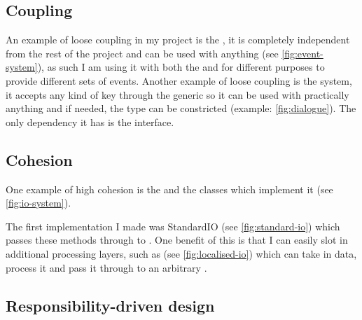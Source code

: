 \documentclass{article}
\begin{document}
\begin{multicols}{2}
            \subsection{Coupling}
                An example of loose coupling in my project is the , it is completely independent from the rest of the project and can be used with anything (see \autoref{fig:event-system}), as such I am using it with both the  and  for different purposes to provide different sets of events. Another example of loose coupling is the  system, it accepts any kind of key through the generic  so it can be used with practically anything and if needed, the type can be constricted (example: \autoref{fig:dialogue}). The only dependency it has is the  interface.

            \subsection{Cohesion}
                One example of high cohesion is the  and the classes which implement it (see \autoref{fig:io-system}).
                
                The first implementation I made was StandardIO (see \autoref{fig:standard-io}) which passes these methods through to . One benefit of this is that I can easily slot in additional processing layers, such as  (see \autoref{fig:localised-io}) which can take in data, process it and pass it through to an arbitrary .

            \subsection{Responsibility-driven design}


\end{multicols}
\end{document}
